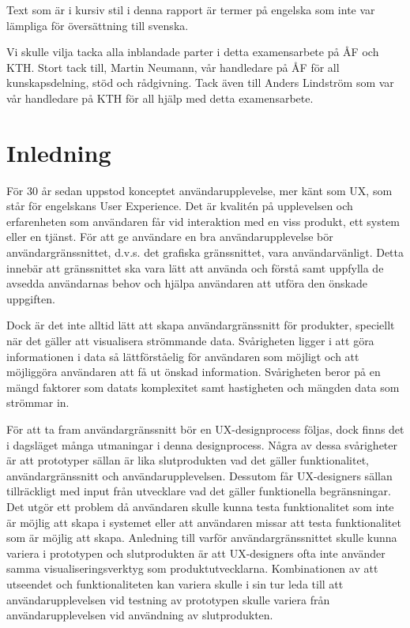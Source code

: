 \documentclass{kththesis}
\begin{document}
Text som är i kursiv stil i denna rapport är termer på engelska som inte var lämpliga för översättning till svenska.

Vi skulle vilja tacka alla inblandade parter i detta examensarbete på ÅF och KTH. Stort tack till, Martin Neumann, vår handledare på ÅF för all kunskapsdelning, stöd och rådgivning. Tack även till Anders Lindström som var vår handledare på KTH för all hjälp med detta examensarbete. 

\tableofcontents


\mainmatter


\chapter{Inledning}

För 30 år sedan uppstod konceptet användarupplevelse, mer känt som UX, som står för engelskans User Experience. Det är kvalitén på upplevelsen och erfarenheten som användaren får vid interaktion med en viss produkt, ett system eller en tjänst. För att ge användare en bra användarupplevelse bör användargränssnittet, d.v.s. det grafiska gränssnittet, vara användarvänligt. Detta innebär att gränssnittet ska vara lätt att använda och förstå samt uppfylla de avsedda användarnas behov och hjälpa användaren att utföra den önskade uppgiften. 

Dock är det inte alltid lätt att skapa användargränssnitt för produkter, speciellt när det gäller att visualisera strömmande data. Svårigheten ligger i att göra informationen i data så lättförståelig för användaren som möjligt och att möjliggöra användaren att få ut önskad information. Svårigheten beror på en mängd faktorer som datats komplexitet samt hastigheten och mängden data som strömmar in.

För att ta fram användargränssnitt bör en UX-designprocess följas, dock finns det i dagsläget många utmaningar i denna designprocess. Några av dessa svårigheter är att prototyper sällan är lika slutprodukten vad det gäller funktionalitet, användargränssnitt och användarupplevelsen. Dessutom får UX-designers sällan tillräckligt med input från utvecklare vad det gäller funktionella begränsningar. Det utgör ett problem då användaren skulle kunna testa funktionalitet som inte är möjlig att skapa i systemet eller att användaren missar att testa funktionalitet som är möjlig att skapa. Anledning till varför användargränssnittet skulle kunna variera i prototypen och slutprodukten är att UX-designers ofta inte använder samma visualiseringsverktyg som produktutvecklarna. Kombinationen av att utseendet och funktionaliteten kan variera skulle i sin tur leda till att användarupplevelsen vid testning av prototypen skulle variera från användarupplevelsen vid användning av slutprodukten. 
\end{document}
